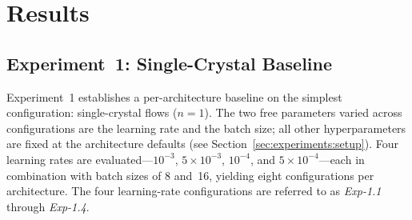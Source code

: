 %
%
%
%
%
\chapter{Results}
\label{ch:results}

\section{Experiment~1: Single-Crystal Baseline}
\label{sec:results:exp1}

Experiment~1 establishes a per-architecture baseline on the simplest configuration: single-crystal flows ($n = 1$). The two free parameters varied across configurations are the learning rate and the batch size; all other hyperparameters are fixed at the architecture defaults (see Section~\ref{sec:experiments:setup}). Four learning rates are evaluated—$10^{-3}$, $5\times10^{-3}$, $10^{-4}$, and $5\times10^{-4}$—each in combination with batch sizes of 8 and~16, yielding eight configurations per architecture. The four learning-rate configurations are referred to as \emph{Exp-1.1} through \emph{Exp-1.4}.

